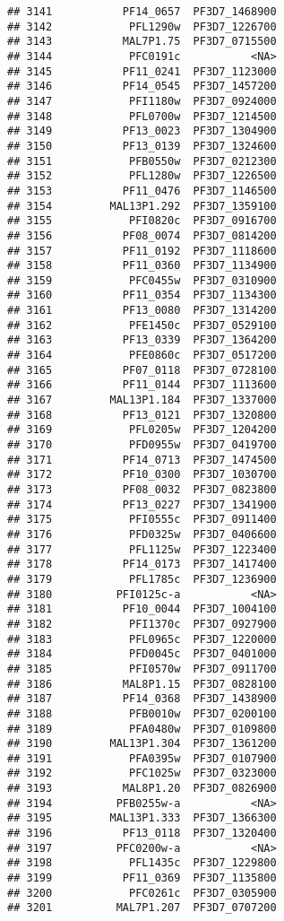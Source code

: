 \documentclass[12pt, a4paper]{article}\usepackage[]{graphicx}\usepackage[]{color}
\makeatletter
\newenvironment{kframe}{%
 \def\at@end@of@kframe{}%
 \ifinner\ifhmode%
  \def\at@end@of@kframe{\end{minipage}}%
  \begin{minipage}{\columnwidth}%
 \fi\fi%
 \def\FrameCommand##1{\hskip\@totalleftmargin \hskip-\fboxsep
 \colorbox{shadecolor}{##1}\hskip-\fboxsep
     \hskip-\linewidth \hskip-\@totalleftmargin \hskip\columnwidth}%
 \MakeFramed {\advance\hsize-\width
   \@totalleftmargin\z@ \linewidth\hsize
   \@setminipage}}%
 {\par\unskip\endMakeFramed%
 \at@end@of@kframe}
\newenvironment{knitrout}{}{} %
\makeatother
\begin{document}
\begin{knitrout}
\begin{kframe}
\begin{verbatim}
## 3141           PF14_0657  PF3D7_1468900
## 3142            PFL1290w  PF3D7_1226700
## 3143           MAL7P1.75  PF3D7_0715500
## 3144            PFC0191c           <NA>
## 3145           PF11_0241  PF3D7_1123000
## 3146           PF14_0545  PF3D7_1457200
## 3147            PFI1180w  PF3D7_0924000
## 3148            PFL0700w  PF3D7_1214500
## 3149           PF13_0023  PF3D7_1304900
## 3150           PF13_0139  PF3D7_1324600
## 3151            PFB0550w  PF3D7_0212300
## 3152            PFL1280w  PF3D7_1226500
## 3153           PF11_0476  PF3D7_1146500
## 3154         MAL13P1.292  PF3D7_1359100
## 3155            PFI0820c  PF3D7_0916700
## 3156           PF08_0074  PF3D7_0814200
## 3157           PF11_0192  PF3D7_1118600
## 3158           PF11_0360  PF3D7_1134900
## 3159            PFC0455w  PF3D7_0310900
## 3160           PF11_0354  PF3D7_1134300
## 3161           PF13_0080  PF3D7_1314200
## 3162            PFE1450c  PF3D7_0529100
## 3163           PF13_0339  PF3D7_1364200
## 3164            PFE0860c  PF3D7_0517200
## 3165           PF07_0118  PF3D7_0728100
## 3166           PF11_0144  PF3D7_1113600
## 3167         MAL13P1.184  PF3D7_1337000
## 3168           PF13_0121  PF3D7_1320800
## 3169            PFL0205w  PF3D7_1204200
## 3170            PFD0955w  PF3D7_0419700
## 3171           PF14_0713  PF3D7_1474500
## 3172           PF10_0300  PF3D7_1030700
## 3173           PF08_0032  PF3D7_0823800
## 3174           PF13_0227  PF3D7_1341900
## 3175            PFI0555c  PF3D7_0911400
## 3176            PFD0325w  PF3D7_0406600
## 3177            PFL1125w  PF3D7_1223400
## 3178           PF14_0173  PF3D7_1417400
## 3179            PFL1785c  PF3D7_1236900
## 3180          PFI0125c-a           <NA>
## 3181           PF10_0044  PF3D7_1004100
## 3182            PFI1370c  PF3D7_0927900
## 3183            PFL0965c  PF3D7_1220000
## 3184            PFD0045c  PF3D7_0401000
## 3185            PFI0570w  PF3D7_0911700
## 3186           MAL8P1.15  PF3D7_0828100
## 3187           PF14_0368  PF3D7_1438900
## 3188            PFB0010w  PF3D7_0200100
## 3189            PFA0480w  PF3D7_0109800
## 3190         MAL13P1.304  PF3D7_1361200
## 3191            PFA0395w  PF3D7_0107900
## 3192            PFC1025w  PF3D7_0323000
## 3193           MAL8P1.20  PF3D7_0826900
## 3194          PFB0255w-a           <NA>
## 3195         MAL13P1.333  PF3D7_1366300
## 3196           PF13_0118  PF3D7_1320400
## 3197          PFC0200w-a           <NA>
## 3198            PFL1435c  PF3D7_1229800
## 3199           PF11_0369  PF3D7_1135800
## 3200            PFC0261c  PF3D7_0305900
## 3201          MAL7P1.207  PF3D7_0707200

\end{verbatim}
\end{kframe}
\end{knitrout}
\end{document}
